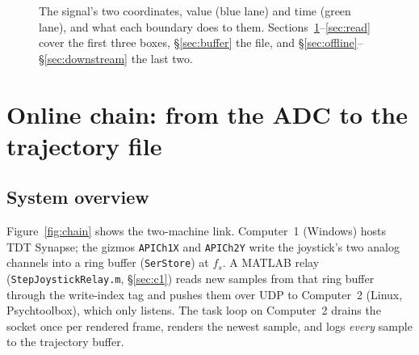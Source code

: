 \documentclass[11pt,a4paper]{article}
\newcommand{\code}[1]{\texttt{\small #1}}
\newcommand{\file}[1]{\texttt{\small #1}}
\begin{document}
\begin{figure}[htbp]
{}
\caption{The signal's two coordinates, value (blue lane) and time (green lane),
and what each boundary does to them. Sections~\ref{sec:online}--\ref{sec:read}
cover the first three boxes, \S\ref{sec:buffer} the file, and
\S\ref{sec:offline}--\S\ref{sec:downstream} the last two.}
\label{fig:onepage}
\end{figure}

\section{Online chain: from the ADC to the trajectory file}
\label{sec:online}

\subsection{System overview}

Figure~\ref{fig:chain} shows the two-machine link. Computer~1 (Windows) hosts
TDT Synapse; the gizmos \code{APICh1X} and \code{APICh2Y} write the joystick's
two analog channels into a ring buffer (\code{SerStore}) at $f_s$. A MATLAB
relay (\file{StepJoystickRelay.m}, \S\ref{sec:c1}) reads new samples from that
ring buffer through the write-index tag and pushes them over UDP to Computer~2
(Linux, Psychtoolbox), which only listens. The task loop on Computer~2 drains
the socket once per rendered frame, renders the newest sample, and logs
\emph{every} sample to the trajectory buffer.
\end{document}
